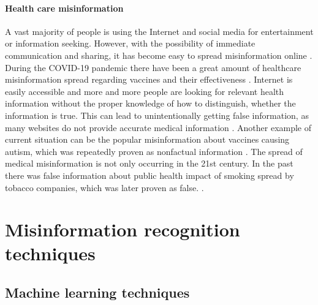 \documentclass[11pt ,english,a4paper]{article}
\begin{document}
\paragraph{Health care misinformation}
A vast majority of people is using the Internet and social media for entertainment or information seeking. However, with the possibility of immediate communication and sharing, it has become easy to spread misinformation online \cite{wa19sys}. During the COVID-19 pandemic there have been a great amount of healthcare misinformation spread regarding vaccines and their effectiveness \cite{chap22unmask}. Internet is easily accessible and more and more people are looking for relevant health information without the proper knowledge of how to distinguish, whether the information is true. This can lead to unintentionally getting false information, as many websites do not provide accurate medical information \cite{cook15misinfo}. Another example of current situation can be the popular misinformation about vaccines causing autism, which was repeatedly proven as nonfactual information \cite{wa19sys}. 
The spread of medical misinformation is not only occurring in the 21st century. In the past there was false information about public health impact of smoking spread by tobacco companies, which was later proven as false. \cite{cook15misinfo}.

\section{Misinformation recognition techniques} \label{tech}


\subsection{Machine learning techniques} \label{tech:mach}
\end{document}
